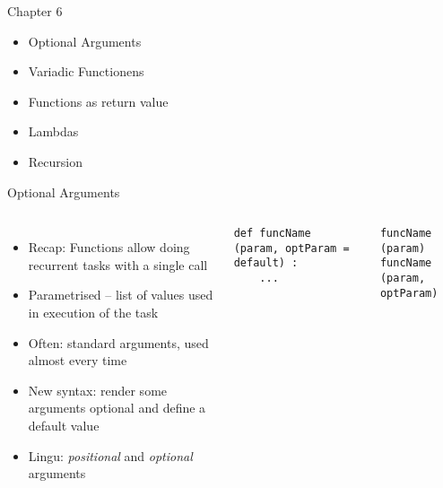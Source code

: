 
\begin{frame}[fragile]{Chapter 6}
%
\begin{itemize}
\item Optional Arguments
\item Variadic Functionens
\item Functions as return value
\item Lambdas
\item Recursion
\end{itemize}
%
\end{frame}


\begin{frame}[fragile]{Optional Arguments}
%
\begin{columns}[T]
\begin{itemize}
\item Recap: Functions allow doing recurrent tasks with a single call
\item Parametrised -- list of values used in execution of the task
\item Often: standard arguments, used almost every time
\item New syntax: render some arguments optional and define a default value
\item Lingu: \emph{positional} and \emph{optional} arguments
\end{itemize}
%
\begin{codebox}
\begin{verbatim}
def funcName (param, optParam = default) :
    ...
\end{verbatim}
\end{codebox}
%
\begin{codebox}
\begin{verbatim}
funcName (param)
funcName (param, optParam)
\end{verbatim}
\end{codebox}
\end{columns}
%
\end{frame}


